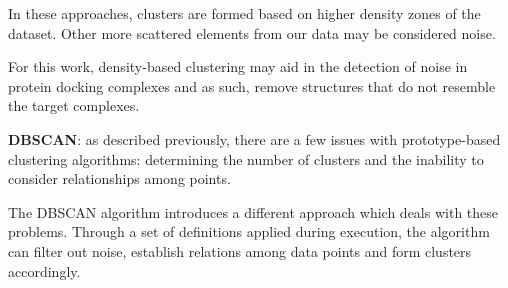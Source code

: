 In these approaches, clusters are formed based on higher density zones of the dataset. Other more scattered elements from our data may be considered noise. 

For this work, density-based clustering may aid in the detection of noise in protein docking complexes and as such, remove structures that do not resemble the target complexes.

\textbf{DBSCAN}: as described previously, there are a few issues with prototype-based clustering algorithms: determining the number of clusters and the inability to consider relationships among points. 

The \gls{DBSCAN} \cite{ester1996density} algorithm introduces a different approach which deals with these problems. Through a set of definitions applied during execution, the algorithm can filter out noise, establish relations among data points and form clusters accordingly.

